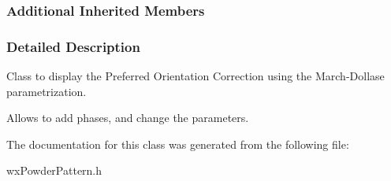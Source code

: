 \subsubsection*{Additional Inherited Members}


\subsubsection{Detailed Description}
Class to display the Preferred Orientation Correction using the March-\/\+Dollase parametrization. 

Allows to add phases, and change the parameters. 

The documentation for this class was generated from the following file\+:\begin{DoxyCompactItemize}
\item 
wx\+Powder\+Pattern.\+h\end{DoxyCompactItemize}
